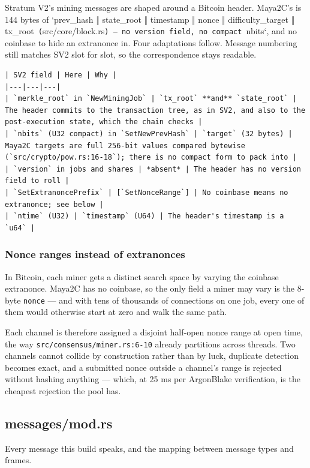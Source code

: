 \documentclass[11pt,a4paper]{article}
\begin{document}
Stratum V2's mining messages are shaped around a Bitcoin header. Maya2C's is
144 bytes of `prev\_hash ‖ state\_root ‖ timestamp ‖ nonce ‖ difficulty\_target
‖ tx\_root\texttt{ (}src/core/block.rs\texttt{) — no version field, no compact }nbits`, and
no coinbase to hide an extranonce in. Four adaptations follow.
Message numbering still matches SV2 slot for slot, so the correspondence
stays readable.

\begin{verbatim}
| SV2 field | Here | Why |
|---|---|---|
| `merkle_root` in `NewMiningJob` | `tx_root` **and** `state_root` | The header commits to the transaction tree, as in SV2, and also to the post-execution state, which the chain checks |
| `nbits` (U32 compact) in `SetNewPrevHash` | `target` (32 bytes) | Maya2C targets are full 256-bit values compared bytewise (`src/crypto/pow.rs:16-18`); there is no compact form to pack into |
| `version` in jobs and shares | *absent* | The header has no version field to roll |
| `SetExtranoncePrefix` | [`SetNonceRange`] | No coinbase means no extranonce; see below |
| `ntime` (U32) | `timestamp` (U64) | The header's timestamp is a `u64` |
\end{verbatim}

\subsubsection{Nonce ranges instead of extranonces}

In Bitcoin, each miner gets a distinct search space by varying the coinbase
extranonce. Maya2C has no coinbase, so the only field a miner may vary is
the 8-byte \texttt{nonce} — and with tens of thousands of connections on one job,
every one of them would otherwise start at zero and walk the same path.

Each channel is therefore assigned a disjoint half-open nonce range at open
time, the way \texttt{src/consensus/miner.rs:6-10} already partitions across
threads. Two channels cannot collide by construction rather than by luck,
duplicate detection becomes exact, and a submitted nonce outside a channel's
range is rejected without hashing anything — which, at 25 ms per ArgonBlake
verification, is the cheapest rejection the pool has.

\subsection{messages/mod.rs}
Every message this build speaks, and the mapping between message types and
frames.
\end{document}
